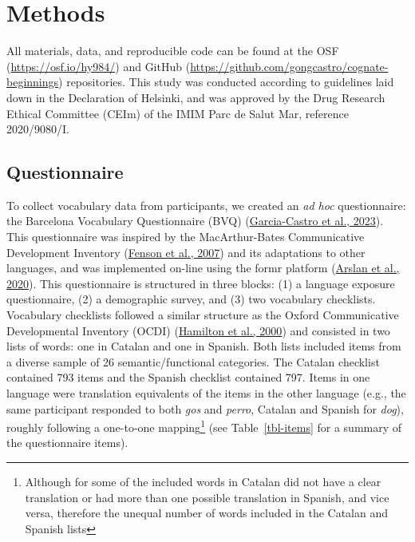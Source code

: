 \documentclass[
]{article}
\begin{document}
\hypertarget{sec-methods}{%
\section{Methods}\label{sec-methods}}

All materials, data, and reproducible code can be found at the OSF
(\url{https://osf.io/hy984/}) and GitHub
(\url{https://github.com/gongcastro/cognate-beginnings}) repositories.
This study was conducted according to guidelines laid down in the
Declaration of Helsinki, and was approved by the Drug Research Ethical
Committee (CEIm) of the IMIM Parc de Salut Mar, reference 2020/9080/I.

\hypertarget{sec-questionnaire}{%
\subsection{Questionnaire}\label{sec-questionnaire}}

To collect vocabulary data from participants, we created an \emph{ad
hoc} questionnaire: the Barcelona Vocabulary Questionnaire (BVQ)
(\protect\hyperlink{ref-garcia-castro2023bvq}{Garcia-Castro et al.,
2023}). This questionnaire was inspired by the MacArthur-Bates
Communicative Development Inventory
(\protect\hyperlink{ref-fenson2007macarthurbates}{Fenson et al., 2007})
and its adaptations to other languages, and was implemented on-line
using the formr platform (\protect\hyperlink{ref-arslan2020formr}{Arslan
et al., 2020}). This questionnaire is structured in three blocks: (1) a
language exposure questionnaire, (2) a demographic survey, and (3) two
vocabulary checklists. Vocabulary checklists followed a similar
structure as the Oxford Communicative Developmental Inventory (OCDI)
(\protect\hyperlink{ref-hamilton2000infant}{Hamilton et al., 2000}) and
consisted in two lists of words: one in Catalan and one in Spanish. Both
lists included items from a diverse sample of 26 semantic/functional
categories. The Catalan checklist contained 793 items and the Spanish
checklist contained 797. Items in one language were translation
equivalents of the items in the other language (e.g., the same
participant responded to both \emph{gos} and \emph{perro}, Catalan and
Spanish for \emph{dog}), roughly following a one-to-one
mapping\footnote{Although for some of the included words in Catalan did
  not have a clear translation or had more than one possible translation
  in Spanish, and vice versa, therefore the unequal number of words
  included in the Catalan and Spanish lists} (see Table~\ref{tbl-items}
for a summary of the questionnaire items).
\end{document}
